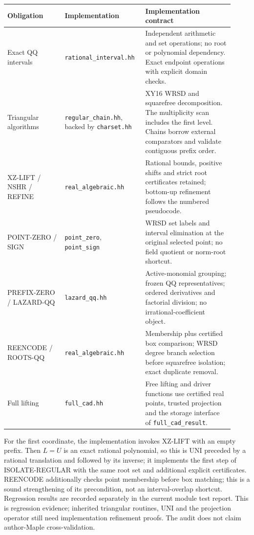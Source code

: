 \documentclass[11pt]{article}
\theoremstyle{definition}
\begin{document}
\begin{longtable}{p{0.24\linewidth}p{0.31\linewidth}p{0.37\linewidth}}
\toprule Obligation & Implementation & Implementation contract\\\midrule
\endhead
Exact QQ intervals & \texttt{rational\_interval.hh} &
Independent arithmetic and set operations; no root or polynomial dependency.
Exact endpoint operations with explicit domain checks.\\
Triangular algorithms & \texttt{regular\_chain.hh}, backed by \texttt{charset.hh} &
XY16 WRSD and squarefree decomposition. The multiplicity scan includes
the first level. Chains borrow external comparators and validate contiguous prefix order.\\
XZ-LIFT / NSHR / REFINE & \texttt{real\_algebraic.hh} &
Rational bounds, positive shifts and strict root certificates retained;
bottom-up refinement follows the numbered pseudocode.\\
POINT-ZERO / SIGN & \texttt{point\_zero}, \texttt{point\_sign} &
WRSD set labels and interval elimination at the original selected point; no field
quotient or norm-root shortcut.\\
PREFIX-ZERO / LAZARD-QQ & \texttt{lazard\_qq.hh} &
Active-monomial grouping; frozen QQ representatives; ordered derivatives and
factorial division; no irrational-coefficient object.\\
REENCODE / ROOTS-QQ & \texttt{real\_algebraic.hh} &
Membership plus certified box comparison; WRSD degree branch selection before
squarefree isolation; exact duplicate removal.\\
Full lifting & \texttt{full\_cad.hh} &
Free lifting and driver functions use certified real points, trusted projection
and the storage interface of \texttt{full\_cad\_result}.\\
\bottomrule
\end{longtable}
For the first coordinate, the implementation invokes XZ-LIFT with an empty
prefix. Then $L=U$ is an exact rational polynomial, so this is UNI preceded by a
rational translation and followed by its inverse; it implements the first step
of ISOLATE-REGULAR with the same root set and additional explicit certificates.
REENCODE additionally checks point membership before box matching; this is a
sound strengthening of its precondition, not an interval-overlap shortcut.
Regression results are recorded separately in the current module test report.
This is regression evidence; inherited
triangular routines, UNI and the projection operator still need implementation
refinement proofs. The audit does not claim author-Maple cross-validation.
\end{document}
